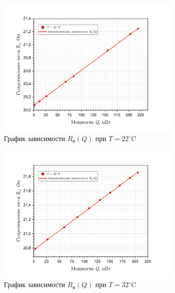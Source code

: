 \documentclass[a4paper, 12pt]{article}
\begin{document}
        \begin{figure}[H]
            \centering
            \includegraphics[width=0.8\textwidth]{images/R(Q)_22.png}
            \caption{График зависимости $R_{\text{н}}(Q)$ при $T = 22 ^\circ$C} 
            \label{graph:R(Q)_22}
        \end{figure}

        \begin{figure}[H]
            \centering
            \includegraphics[width=0.8\textwidth]{images/R(Q)_32.png}
            \caption{График зависимости $R_{\text{н}}(Q)$ при $T = 32 ^\circ$C} 
            \label{graph:R(Q)_32}
        \end{figure}
\end{document}
